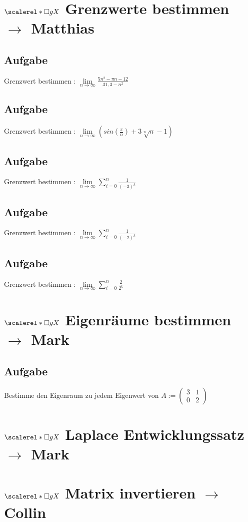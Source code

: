\documentclass[11pt]{article}
\def\msquare{\mathord{\scalerel*{\Box}{gX}}}
\begin{document}
    \section{$\msquare$ \hspace*{5mm} Grenzwerte bestimmen $\longrightarrow$ Matthias}
    \subsection{Aufgabe}
    Grenzwert bestimmen : $\lim \limits_{n \to \infty}\frac{5n^2-\pi n-12}{31,3-n^2}$
    \subsection{Aufgabe}
    Grenzwert bestimmen : $\lim \limits_{n \to \infty}(sin(\frac{\pi}{n})+3\sqrt[n]{n}-1)$
    \subsection{Aufgabe}
    Grenzwert bestimmen : $\lim \limits_{n \to \infty}\sum\limits_{i=0}^{n}\frac{1}{(-3)^k}$
    \subsection{Aufgabe}
    Grenzwert bestimmen : $\lim \limits_{n \to \infty}\sum\limits_{i=0}^{n}\frac{1}{(-2)^k}$
    \subsection{Aufgabe}
    Grenzwert bestimmen : $\lim \limits_{n \to \infty}\sum\limits_{i=0}^{n}\frac{2}{2^k}$

    \section{$\msquare$ \hspace*{5mm} Eigenräume bestimmen $\longrightarrow$ Mark}
    \subsection{Aufgabe}
    Bestimme den Eigenraum zu jedem Eigenwert von  $A:=\begin{pmatrix}
                                                             3&1\\0&2
    \end{pmatrix}$

    \section{$\msquare$ \hspace*{5mm} Laplace Entwicklungssatz $\longrightarrow$ Mark}
    \section{$\msquare$ \hspace*{5mm} Matrix invertieren $\longrightarrow$ Collin}
\end{document}
